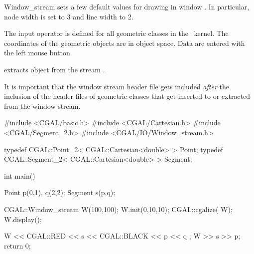 \begin{ccClass} {Window_stream}
{sets a few default values for drawing in window . In particular, node width is
set to 3 and line width to 2.}



The input operator is defined for all geometric classes in the \cgal\ kernel.
The coordinates of the geometric objects are in object space. Data are
entered with the left mouse button.

       {extracts object  from the stream \ccVar.}

\ccExample

It is important that the window stream header file gets included
{\em after} the inclusion of the header files of geometric classes
that get inserted to or extracted from the window stream.

\begin{cprog}

#include <CGAL/basic.h>
#include <CGAL/Cartesian.h>
#include <CGAL/Segment_2.h>
#include <CGAL/IO/Window_stream.h>

typedef CGAL::Point_2< CGAL::Cartesian<double> >     Point;
typedef CGAL::Segment_2< CGAL::Cartesian<double> >   Segment;

int main()
{
    Point p(0,1), q(2,2);
    Segment s(p,q);

    CGAL::Window_stream W(100,100);
    W.init(0,10,10);
    CGAL::cgalize( W);
    W.display();

    W << CGAL::RED << s << CGAL::BLACK << p << q ;
    W >> s >> p;
    return 0;
}
\end{cprog} 

\end{ccClass} 
